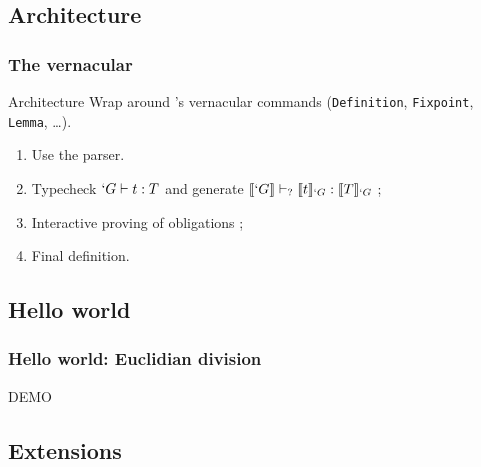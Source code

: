\subsection{Architecture}
\begin{frame}[t]
  \frametitle{The \Program vernacular}
  
  \begin{block}{Architecture}
    Wrap around \Coq{}'s vernacular commands (\texttt{Definition},
    \texttt{Fixpoint}, \texttt{Lemma}, \ldots).
    
    \begin{enumerate}
    \item<2-> Use the \Coq{} parser.
    \item<3-> Typecheck $`G \vdash t : T$ and generate
      $\llbracket `G \rrbracket \vdash_{?} \llbracket t \rrbracket_{`G} : \llbracket T \rrbracket_{`G}$ ;
    \item<4-> Interactive proving of obligations ;
    \item<5-> Final definition.
    \end{enumerate}
  \end{block}
  
  
\end{frame}

\subsection{Hello world}
\begin{frame}
  \frametitle{Hello world: Euclidian division}

  {\huge DEMO}

\end{frame}

\subsection{Extensions}
\frame{\tableofcontents[currentsubsection]}


